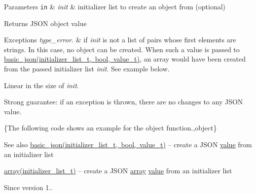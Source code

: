 \begin{DoxyParams}[1]{Parameters}
\mbox{\tt in}  & {\em init} & initializer list to create an object from (optional)\\
\hline
\end{DoxyParams}
\begin{DoxyReturn}{Returns}
J\+S\+ON object value
\end{DoxyReturn}

\begin{DoxyExceptions}{Exceptions}
{\em type\+\_\+error.} & if {\itshape init} is not a list of pairs whose first elements are strings. In this case, no object can be created. When such a value is passed to \mbox{\hyperlink{classnlohmann_1_1basic__json_ab5dfd9a2b2663b219641cb7fe59b6da2}{basic\+\_\+json(initializer\+\_\+list\+\_\+t, bool, value\+\_\+t)}}, an array would have been created from the passed initializer list {\itshape init}. See example below.\\
\hline
\end{DoxyExceptions}
Linear in the size of {\itshape init}.

Strong guarantee\+: if an exception is thrown, there are no changes to any J\+S\+ON value.

\{The following code shows an example for the {\ttfamily object} function.,object\}

\begin{DoxySeeAlso}{See also}
\mbox{\hyperlink{classnlohmann_1_1basic__json_ab5dfd9a2b2663b219641cb7fe59b6da2}{basic\+\_\+json(initializer\+\_\+list\+\_\+t, bool, value\+\_\+t)}} -- create a J\+S\+ON \mbox{\hyperlink{classnlohmann_1_1basic__json_adcf8ca5079f5db993820bf50036bf45d}{value}} from an initializer list 

\mbox{\hyperlink{classnlohmann_1_1basic__json_aa80485befaffcadaa39965494e0b4d2e}{array(initializer\+\_\+list\+\_\+t)}} -- create a J\+S\+ON \mbox{\hyperlink{classnlohmann_1_1basic__json_aa80485befaffcadaa39965494e0b4d2e}{array}} \mbox{\hyperlink{classnlohmann_1_1basic__json_adcf8ca5079f5db993820bf50036bf45d}{value}} from an initializer list
\end{DoxySeeAlso}
\begin{DoxySince}{Since}
version 1.. 
\end{DoxySince}
\mbox{\label{classnlohmann_1_1basic__json_a26ef3058e249f82a04f8ec18f7419027}} 

